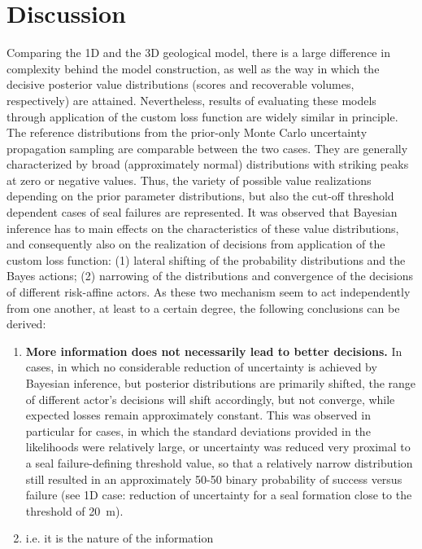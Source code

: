 	\chapter{Discussion}\label{cha:discussion}
	Comparing the 1D and the 3D geological model, there is a large difference in complexity behind the model construction, as well as the way in which the decisive posterior value distributions (scores and recoverable volumes, respectively) are attained. Nevertheless, results of evaluating these models through application of the custom loss function are widely similar in principle. The reference distributions from the prior-only Monte Carlo uncertainty propagation sampling are comparable between the two cases. They are generally characterized by broad (approximately normal) distributions with striking peaks at zero or negative values. Thus, the variety of possible value realizations depending on the prior parameter distributions, but also the cut-off threshold dependent cases of seal failures are represented. It was observed that Bayesian inference has to main effects on the characteristics of these value distributions, and consequently also on the realization of decisions from application of the custom loss function: (1) lateral shifting of the probability distributions and the Bayes actions; (2) narrowing of the distributions and convergence of the decisions of different risk-affine actors. 
	As these two mechanism seem to act independently from one another, at least to a certain degree, the following conclusions can be derived:
	\begin{enumerate}
	\item \textbf{More information does not necessarily lead to better decisions.} In cases, in which no considerable reduction of uncertainty is achieved by Bayesian inference, but posterior distributions are primarily shifted, the range of different actor's decisions will shift accordingly, but not converge, while expected losses remain approximately constant. This was observed in particular for cases, in which the standard deviations provided in the likelihoods were relatively large, or uncertainty was reduced very proximal to a seal failure-defining threshold value, so that a relatively narrow distribution still resulted in an approximately 50-50 binary probability of success versus failure (see 1D case: reduction of uncertainty for a seal formation close to the threshold of 20~m).
	\item {} i.e. it is the nature of the information
	\end{enumerate}  
	
